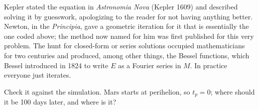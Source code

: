 \documentclass[
  10.5pt,
  letterpaper,
]{scrbook}
\theoremstyle{plain}
\theoremstyle{remark}
\begin{document}
\begin{tcolorbox}[enhanced jigsaw, arc=.35mm, bottomrule=.15mm, bottomtitle=1mm, breakable, colback=white, colbacktitle=quarto-callout-note-color!10!white, colframe=quarto-callout-note-color-frame, coltitle=black, left=2mm, leftrule=.75mm, opacityback=0, opacitybacktitle=0.6, rightrule=.15mm, title={Where it comes from}, titlerule=0mm, toprule=.15mm, toptitle=1mm]

Kepler stated the equation in \emph{Astronomia Nova} (Kepler 1609) and
described solving it by guesswork, apologizing to the reader for not
having anything better. Newton, in the \emph{Principia}, gave a
geometric iteration for it that is essentially the one coded above; the
method now named for him was first published for this very problem. The
hunt for closed-form or series solutions occupied mathematicians for two
centuries and produced, among other things, the Bessel functions, which
Bessel introduced in 1824 to write \(E\) as a Fourier series in \(M\).
In practice everyone just iterates.

\end{tcolorbox}

Check it against the simulation. Mars starts at perihelion, so
\(t_p = 0\); where should it be 100 days later, and where is it?
\end{document}
